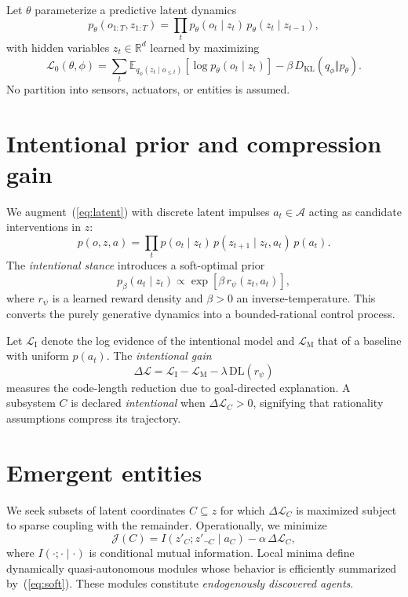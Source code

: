 \documentclass[11pt]{article}
\begin{document}
Let $\theta$ parameterize a predictive latent dynamics
\begin{equation}
p_\theta(o_{1:T},z_{1:T})=
\prod_{t} p_\theta(o_t\mid z_t)\,p_\theta(z_t\mid z_{t-1}),
\label{eq:latent}
\end{equation}
with hidden variables $z_t\in\mathbb R^d$ learned by maximizing
\[
\mathcal{L}_0(\theta,\phi)
=\sum_t \mathbb E_{q_\phi(z_t\mid o_{\le t})}
[\log p_\theta(o_t\mid z_t)]-\beta\,D_{\mathrm{KL}}(q_\phi\Vert p_\theta).
\]
No partition into sensors, actuators, or entities is assumed.

\section{Intentional prior and compression gain}

We augment~(\ref{eq:latent}) with discrete latent impulses
$a_t\in\mathcal A$ acting as candidate interventions in $z$:
\begin{equation}
p(o,z,a)=
\prod_t p(o_t\mid z_t)\,p(z_{t+1}\mid z_t,a_t)\,p(a_t).
\end{equation}
The \emph{intentional stance} introduces a soft-optimal prior
\begin{equation}
p_\beta(a_t\mid z_t)
\propto \exp[\beta\,r_\psi(z_t,a_t)],
\label{eq:soft}
\end{equation}
where $r_\psi$ is a learned reward density and $\beta>0$ an inverse-temperature.
This converts the purely generative dynamics into a bounded-rational control process.

Let $\mathcal{L}_\mathrm{I}$ denote the log evidence of the intentional model and
$\mathcal{L}_\mathrm{M}$ that of a baseline with uniform $p(a_t)$.
The \emph{intentional gain}
\begin{equation}
\Delta\mathcal L
=\mathcal{L}_\mathrm{I}-\mathcal{L}_\mathrm{M}
-\lambda\,\mathrm{DL}(r_\psi)
\label{eq:gain}
\end{equation}
measures the code-length reduction due to goal-directed explanation.
A subsystem $C$ is declared \emph{intentional} when $\Delta\mathcal L_C>0$,
signifying that rationality assumptions compress its trajectory.

\section{Emergent entities}

We seek subsets of latent coordinates $C\subseteq z$ for which $\Delta\mathcal L_C$ is maximized subject to sparse coupling with the remainder.
Operationally, we minimize
\begin{equation}
\mathcal{J}(C)=
I(z'_{C};z'_{\neg C}\mid a_C)
-\alpha\,\Delta\mathcal L_C,
\end{equation}
where $I(\cdot;\cdot\mid\cdot)$ is conditional mutual information.
Local minima define dynamically quasi-autonomous modules whose behavior is efficiently summarized by~(\ref{eq:soft}).
These modules constitute \emph{endogenously discovered agents}.
\end{document}
